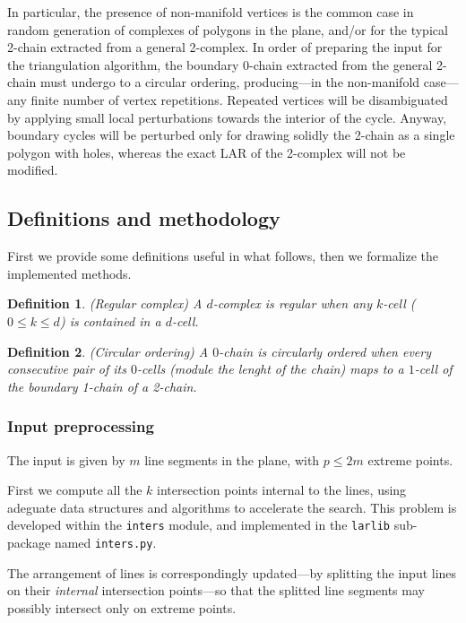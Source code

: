 \documentclass[11pt,oneside]{article}	%
\newtheorem{definition}{Definition}
\begin{document}
In particular, the presence of non-manifold vertices is the common case in random generation of complexes of polygons in the plane, and/or for the typical 2-chain extracted from a general 2-complex. In order of preparing the input for the triangulation algorithm, the boundary 0-chain extracted from the general 2-chain must undergo to a  circular ordering, producing---in the non-manifold case---any finite number of vertex repetitions. Repeated vertices will be disambiguated by applying small local perturbations towards the interior of the cycle. Anyway, boundary cycles will be perturbed only for drawing solidly the 2-chain as a single polygon with holes, whereas the exact LAR of the 2-complex will not be modified.

\subsection{Definitions and methodology}

First we provide some definitions useful in what follows, then we formalize the implemented methods.

\begin{definition}{(Regular complex)}
A $d$-complex is \emph{regular} when any $k$-cell ($0 \leq k \leq d$) is contained in a $d$-cell.
\end{definition}

\begin{definition}{(Circular ordering)}
A $0$-chain is \emph{circularly ordered} when every consecutive pair of its $0$-cells (module the lenght of the chain) maps to a $1$-cell of the boundary 1-chain of a 2-chain.
\end{definition}



\subsubsection{Input preprocessing}

The input is given by $m$ line segments in the plane, with $p\leq 2m$ extreme points.

First we compute all the $k$ intersection points internal to the lines, using adeguate data structures and algorithms to accelerate the search. This problem is developed within the \texttt{inters} module, and implemented in the \texttt{larlib} sub-package named \texttt{inters.py}. 

The arrangement of lines is correspondingly updated---by splitting the input lines on their \emph{internal} intersection points---so that the splitted line segments may possibly intersect only on extreme points.
\end{document}
